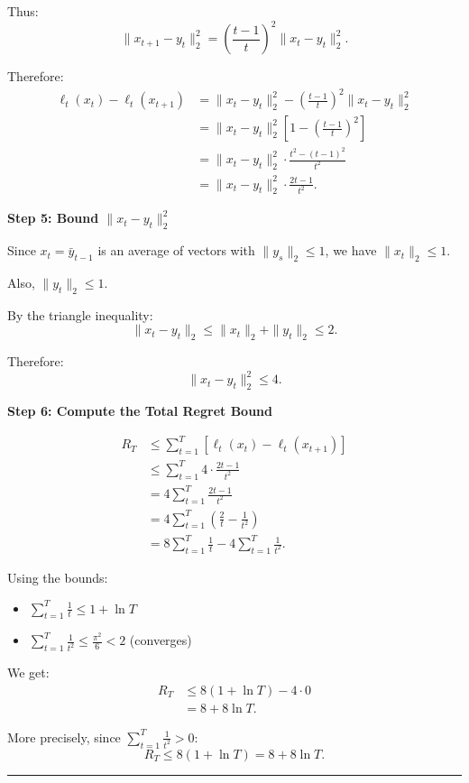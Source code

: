 \documentclass[12pt,letterpaper]{article}
\newenvironment{proof}{\noindent{\bf Proof:}}{\qed\bigskip}
\newcommand{\qed}{\rule{7pt}{7pt}}
\begin{document}
\begin{enumerate}
\begin{proof}
Thus:
\[
\|x_{t+1} - y_t\|_2^2 = \left(\frac{t-1}{t}\right)^2\|x_t - y_t\|_2^2.
\]

Therefore:
\begin{align*}
\ell_t(x_t) - \ell_t(x_{t+1}) &= \|x_t - y_t\|_2^2 - \left(\frac{t-1}{t}\right)^2\|x_t - y_t\|_2^2 \\
&= \|x_t - y_t\|_2^2 \left[1 - \left(\frac{t-1}{t}\right)^2\right] \\
&= \|x_t - y_t\|_2^2 \cdot \frac{t^2 - (t-1)^2}{t^2} \\
&= \|x_t - y_t\|_2^2 \cdot \frac{2t - 1}{t^2}.
\end{align*}

\bigskip

\textbf{Step 5: Bound $\|x_t - y_t\|_2^2$}

Since $x_t = \bar{y}_{t-1}$ is an average of vectors with $\|y_s\|_2 \leq 1$, we have $\|x_t\|_2 \leq 1$.

Also, $\|y_t\|_2 \leq 1$.

By the triangle inequality:
\[
\|x_t - y_t\|_2 \leq \|x_t\|_2 + \|y_t\|_2 \leq 2.
\]

Therefore:
\[
\|x_t - y_t\|_2^2 \leq 4.
\]

\bigskip

\textbf{Step 6: Compute the Total Regret Bound}

\begin{align*}
R_T &\leq \sum_{t=1}^{T}\left[\ell_t(x_t) - \ell_t(x_{t+1})\right] \\
&\leq \sum_{t=1}^{T} 4 \cdot \frac{2t-1}{t^2} \\
&= 4\sum_{t=1}^{T}\frac{2t-1}{t^2} \\
&= 4\sum_{t=1}^{T}\left(\frac{2}{t} - \frac{1}{t^2}\right) \\
&= 8\sum_{t=1}^{T}\frac{1}{t} - 4\sum_{t=1}^{T}\frac{1}{t^2}.
\end{align*}

Using the bounds:
\begin{itemize}
    \item $\sum_{t=1}^{T}\frac{1}{t} \leq 1 + \ln T$
    \item $\sum_{t=1}^{T}\frac{1}{t^2} \leq \frac{\pi^2}{6} < 2$ (converges)
\end{itemize}

We get:
\begin{align*}
R_T &\leq 8(1 + \ln T) - 4 \cdot 0 \\
&= 8 + 8\ln T.
\end{align*}

More precisely, since $\sum_{t=1}^{T}\frac{1}{t^2} > 0$:
\[
R_T \leq 8(1 + \ln T) = 8 + 8\ln T.
\]


\end{proof}
\end{enumerate}
\end{document}
